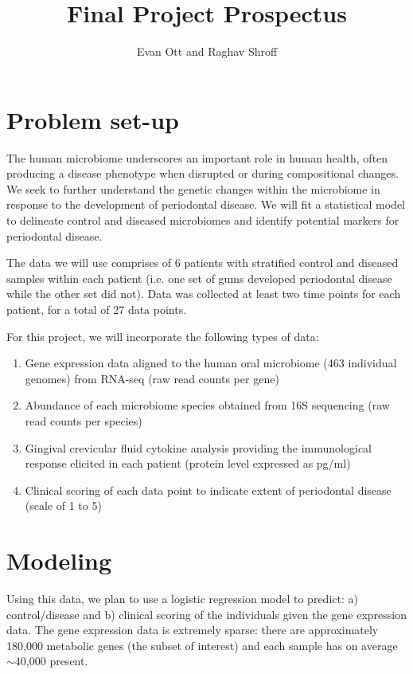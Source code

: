 \documentclass{article}
\title{\vspace{-6ex}Final Project Prospectus\vspace{-2ex}}
\author{Evan Ott and Raghav Shroff\vspace{-2ex}}
\begin{document}
\maketitle

\section{Problem set-up}
The human microbiome underscores an important role in human health, often producing a disease phenotype when disrupted or during compositional changes. We seek to further understand the genetic changes within the microbiome in response to the development of periodontal disease. We will fit a statistical model to delineate control and diseased microbiomes and identify potential markers for periodontal disease. 

The data we will use comprises of 6 patients with stratified control and diseased samples within each patient (i.e. one set of gums developed periodontal disease while the other set did not). Data was collected at least two time points for each patient, for a total of 27 data points.

For this project, we will incorporate the following types of data:
\begin{enumerate}[(1)]
\item Gene expression data aligned to the human oral microbiome (463 individual genomes) from RNA-seq (raw read counts per gene)
\item Abundance of each microbiome species obtained from 16S sequencing (raw read counts per species)
\item Gingival crevicular fluid cytokine analysis providing the immunological response elicited in each patient (protein level expressed as pg/ml)
\item Clinical scoring of each data point to indicate extent of periodontal disease (scale of 1 to 5)
\end{enumerate}

\section{Modeling}
Using this data, we plan to use a logistic regression model to predict: a) control/disease and b) clinical scoring of the individuals given the gene expression data. The gene expression data is extremely sparse: there are approximately 180,000 metabolic genes (the subset of interest) and each sample has on average $\sim$40,000 present.
\end{document}
